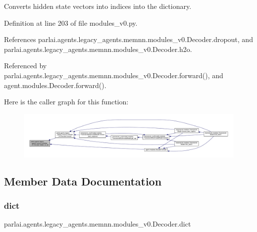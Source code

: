 \begin{DoxyVerb}Converts hidden state vectors into indices into the dictionary.\end{DoxyVerb}
 

Definition at line 203 of file modules\+\_\+v0.\+py.



References parlai.\+agents.\+legacy\+\_\+agents.\+memnn.\+modules\+\_\+v0.\+Decoder.\+dropout, and parlai.\+agents.\+legacy\+\_\+agents.\+memnn.\+modules\+\_\+v0.\+Decoder.\+h2o.



Referenced by parlai.\+agents.\+legacy\+\_\+agents.\+memnn.\+modules\+\_\+v0.\+Decoder.\+forward(), and agent.\+modules.\+Decoder.\+forward().

Here is the caller graph for this function\+:
\nopagebreak
\begin{figure}[H]
\begin{center}
\leavevmode
\includegraphics[width=350pt]{classparlai_1_1agents_1_1legacy__agents_1_1memnn_1_1modules__v0_1_1Decoder_aafa684988d164a4ec2cfdb141e1ea31e_icgraph}
\end{center}
\end{figure}


\subsection{Member Data Documentation}
\mbox{\label{classparlai_1_1agents_1_1legacy__agents_1_1memnn_1_1modules__v0_1_1Decoder_a612b3cfacbcdef8db8a7c6adc45e6695}} 
\subsubsection{\texorpdfstring{dict}{dict}}
{\footnotesize\ttfamily parlai.\+agents.\+legacy\+\_\+agents.\+memnn.\+modules\+\_\+v0.\+Decoder.\+dict}



